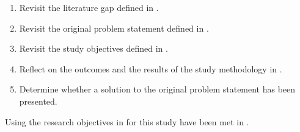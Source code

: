 \begin{enumerate}[label=\textbf{\Roman*.}]
	\item Revisit the literature gap defined in .
	\item Revisit the original problem statement defined in .
	\item Revisit the study objectives defined in .
	\item Reflect on the outcomes and the results of the study methodology in .
	\item Determine whether a solution to the original problem statement has been presented. 
\end{enumerate}

Using the research objectives in  for this study have been met in . 

